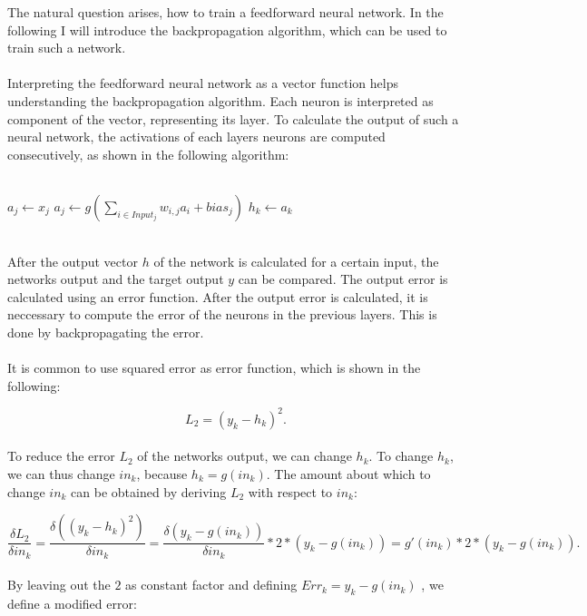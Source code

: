 The natural question arises, how to train a feedforward neural network. In the following I will introduce the backpropagation algorithm, which can be used to train such a network. 
\\
\\
Interpreting the feedforward neural network as a vector function helps understanding the backpropagation algorithm. Each neuron is interpreted as component of the vector, representing its layer. To calculate the output of such a neural network, the activations of each layers neurons are computed consecutively, as shown in the following algorithm: 
\\
\\
\begin{algorithm}[H]
	 {
		$a_j \leftarrow x_j $
	}
	 {
		 {
			$a_j \leftarrow g(\sum\limits_{i \in Input_j} w_{i,j} a_i + bias_j)$
		}
	}
	  {
		$h_k \leftarrow a_k$	
	}
\end{algorithm}
~\\
After the output vector $h$ of the network is calculated for a certain input, the networks output and the target output $y$ can be compared. The output error is calculated using an error function. After the output error is calculated, it is neccessary to compute the error of the neurons in the previous layers. This is done by backpropagating the error. 
\\
\\
It is common to use squared error as error function, which is shown in the following:

\begin{equation*}
L_2 = (y_k - h_k)^2.
\end{equation*}
\\
To reduce the error $L_2$ of the networks output, we can change $h_k$. To change $h_k$, we can thus change $in_k$, because $h_k = g(in_k)$. The amount about which to change $in_k$ can be obtained by deriving $L_2$ with respect to $in_k$: 

\begin{equation*}
\frac{ \delta L_2 }{ \delta in_k }    =    \frac{ \delta ((y_k - h_k)^2) }{ \delta in_k }     =      \frac{ \delta (y_k - g(in_k)) }{ \delta in_k }  *  2 * (y_k - g(in_k) )   =   g'(in_k) * 2 * (y_k - g(in_k)).
\end{equation*}
\\
By leaving out the $2$ as constant factor and defining $Err_k = y_k - g(in_k)$ , we define a modified error:

